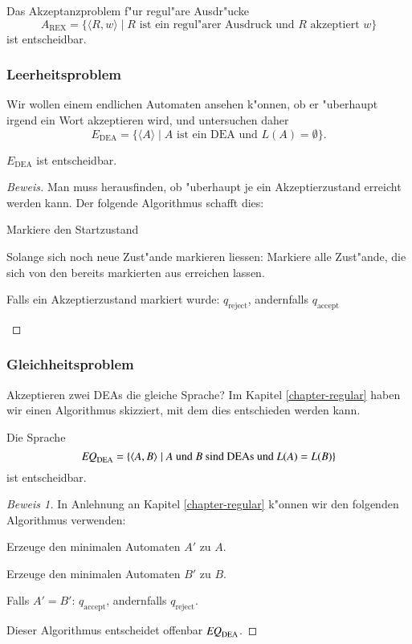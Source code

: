 \begin{satz} Das Akzeptanzproblem f"ur regul"are Ausdr"ucke
\[
A_{\text{REX}}=\{
\langle R,w\rangle\;|\;\text{$R$ ist ein regul"arer Ausdruck und $R$ akzeptiert $w$}
\}
\]
ist entscheidbar.
\end{satz}

\subsubsection{Leerheitsproblem}
Wir wollen einem endlichen Automaten ansehen k"onnen, ob er "uberhaupt
irgend ein Wort akzeptieren wird, und untersuchen daher
\[
E_{\text{DEA}}
=\{
\langle A\rangle \;|\;\text{$A$  ist ein DEA und $L(A)=\emptyset$}
\}.
\]
\begin{satz}
$E_{\text{DEA}}$
ist entscheidbar.
\end{satz}

\begin{proof}[Beweis]
Man muss herausfinden, ob "uberhaupt je ein Akzeptierzustand erreicht
werden kann.
Der folgende Algorithmus schafft dies:
\medskip
\begin{compactenum}
\item Markiere den Startzustand
\item Solange sich noch neue Zust"ande markieren liessen:
 Markiere alle Zust"ande, die sich von den bereits markierten aus
erreichen lassen.
\item Falls ein Akzeptierzustand markiert wurde: $q_{\text{reject}}$,
andernfalls
$q_{\text{accept}}$
\end{compactenum}
\medskip
\end{proof}

\subsubsection{Gleichheitsproblem}
Akzeptieren zwei DEAs die gleiche Sprache? Im Kapitel \ref{chapter-regular}
haben wir einen Algorithmus skizziert, mit dem dies entschieden werden kann.

\begin{satz}
Die Sprache
\[
\text{\it EQ}_{\text{DEA}}=\{
\langle A,B\rangle\;|\;\text{$A$ und $B$ sind DEAs und $L(A)=L(B)$}
\}
\]
ist entscheidbar.
\end{satz}

\begin{proof}[Beweis 1]
In Anlehnung an Kapitel \ref{chapter-regular} k"onnen wir den folgenden
Algorithmus verwenden:
\medskip
\begin{compactenum}
\item Erzeuge den minimalen Automaten $A'$ zu $A$.
\item Erzeuge den minimalen Automaten $B'$ zu $B$.
\item Falls $A'=B'$: $q_{\text{accept}}$, andernfalls $q_{\text{reject}}$.
\end{compactenum}
\medskip
Dieser Algorithmus entscheidet offenbar 
$\text{\it EQ}_{\text{DEA}}$.
\end{proof}

